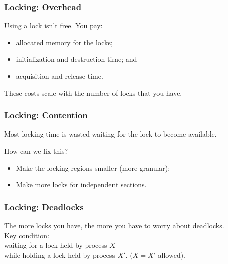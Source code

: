 \begin{frame}
  \frametitle{Locking: Overhead}

  

  Using a lock isn't free. You pay:
  \begin{itemize}
    \item allocated memory for the locks;
    \item initialization and destruction time; and
    \item acquisition and release time.
  \end{itemize}

  These costs scale with the number of locks that you have.
  
\end{frame}

\begin{frame}
  \frametitle{Locking: Contention}

  
    Most locking time is wasted waiting for the lock to become available.

    How can we fix this?
      \begin{itemize}
        \item Make the locking regions smaller (more granular);
        \item Make more locks for independent sections.
      \end{itemize}
  
\end{frame}

\begin{frame}
  \frametitle{Locking: Deadlocks}

  
  The more locks you have, the more you have to worry about deadlocks.\\[1em]

  Key condition: \\ 
\qquad waiting for a lock held by process $X$ \\while holding
a lock held by process $X'$. ($X = X'$ allowed).
  

\end{frame}



